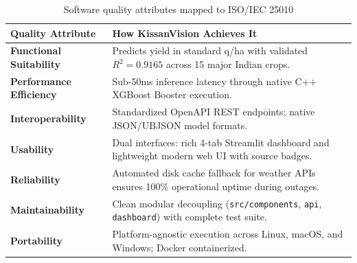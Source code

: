 \documentclass[11pt,a4paper]{report}
\begin{document}
\begin{table}[htbp]
\centering
\small
\caption{Software quality attributes mapped to ISO/IEC 25010}
\begin{tabularx}{\textwidth}{lX}
\toprule
\textbf{Quality Attribute} & \textbf{How KissanVision Achieves It} \\
\midrule
\textbf{Functional Suitability} & Predicts yield in standard q/ha with validated $R^2 = 0.9165$ across 15 major Indian crops. \\
\textbf{Performance Efficiency} & Sub-50ms inference latency through native C++ XGBoost Booster execution. \\
\textbf{Interoperability} & Standardized OpenAPI REST endpoints; native JSON/UBJSON model formats. \\
\textbf{Usability} & Dual interfaces: rich 4-tab Streamlit dashboard and lightweight modern web UI with source badges. \\
\textbf{Reliability} & Automated disk cache fallback for weather APIs ensures 100\% operational uptime during outages. \\
\textbf{Maintainability} & Clean modular decoupling (\texttt{src/components}, \texttt{api}, \texttt{dashboard}) with complete test suite. \\
\textbf{Portability} & Platform-agnostic execution across Linux, macOS, and Windows; Docker containerized. \\
\bottomrule
\end{tabularx}
\end{table}

\appendix
\end{document}
